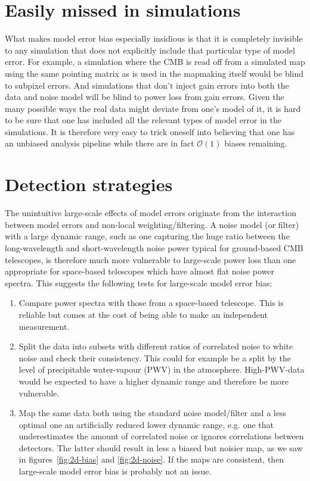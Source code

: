 \documentclass[twocolumn,apj]{aastex63}
\begin{document}
\section{Easily missed in simulations}
What makes model error bias especially insidious is that
it is completely invisible to any simulation that does not explicitly include
that particular type of model error. For example, a simulation where the CMB
is read off from a simulated map using the same pointing matrix as is used
in the mapmaking itself would be blind to subpixel errors. And simulations that
don't inject gain errors into both the data and noise model will be blind to
power loss from gain errors. Given the many
possible ways the real data might deviate from one's model of it, it is hard
to be sure that one has included all the relevant types of model error in the simulations.
It is therefore very easy to trick oneself into believing that one has an
unbiased analysis pipeline while there are in fact $\mathcal{O}(1)$ biases remaining.

\section{Detection strategies}
The unintuitive large-scale effects of model errors originate from the interaction
between model errors and non-local weighting/filtering. A noise model (or filter) with
a large dynamic range, such as one capturing the huge ratio between the long-wavelength
and short-wavelength noise power typical for ground-based CMB telescopes, is therefore
much more vulnerable to large-scale power loss than one appropriate for
space-based telescopes which have almost flat noise power spectra. This suggests
the following tests for large-scale model error bias:
\begin{enumerate}
	\item Compare power spectra with those from a space-based telescope.
		This is reliable but comes at the cost of being able to make an independent measurement.
	\item Split the data into subsets with different ratios of correlated noise to white noise
		and check their consistency. This could for example be a split by the
		level of precipitable water-vapour (PWV) in the atmosphere. High-PWV-data
		would be expected to have a higher dynamic range and therefore be more vulnerable.
	\item Map the same data both using the standard noise model/filter and a
		less optimal one an artificially reduced lower dynamic range, e.g. one that
		underestimates the amount of correlated noise or ignores correlations between
		detectors. The latter should result in less a biased but noisier map, as we saw
		in figures~\ref{fig:2d-bias} and \ref{fig:2d-noise}.
		If the maps are consistent, then large-scale model error bias is probably not an issue.
\end{enumerate}
\end{document}
